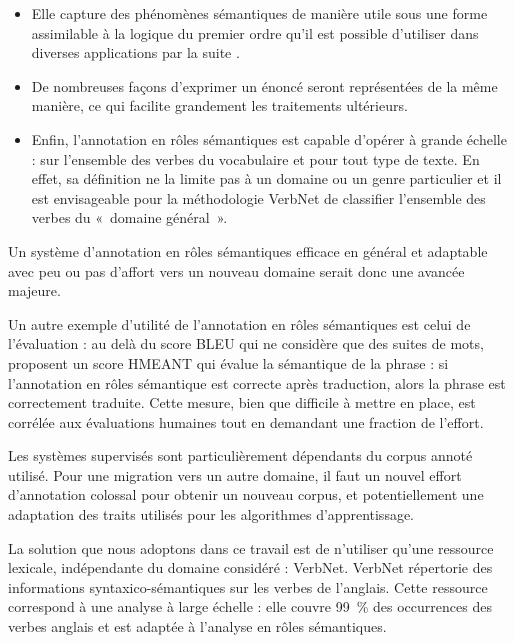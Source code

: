 \documentclass[oneside,parskip]{scrbook}
\begin{document}
\begin{itemize}

    \item Elle capture des phénomènes sémantiques de manière utile sous une
    forme assimilable à la logique du premier ordre qu'il est possible
    d'utiliser dans diverses applications par la suite
    \citep{osman2012improved,xie2013semantic}.

    \item De nombreuses façons d'exprimer un énoncé seront représentées de la
    même manière, ce qui facilite grandement les traitements ultérieurs.

    \item Enfin, l'annotation en rôles sémantiques est capable d'opérer à
    grande échelle : sur l'ensemble des verbes du vocabulaire et pour tout
    type de texte.  En effet, sa définition ne la limite pas à un domaine
    ou un genre particulier et il est envisageable pour la méthodologie
    VerbNet de classifier l'ensemble des verbes du «~domaine général~».

\end{itemize}


Un système d'annotation en rôles sémantiques efficace en général et adaptable
avec peu ou pas d'affort vers un nouveau domaine serait donc une avancée
majeure.

Un autre exemple d'utilité de l'annotation en rôles sémantiques est celui de
l'évaluation : au delà du score BLEU qui ne considère que des suites de mots,
\cite{lo2011smt} proposent un score HMEANT qui évalue la sémantique de la
phrase : si l'annotation en rôles sémantique est correcte après traduction,
alors la phrase est correctement traduite. Cette mesure, bien que difficile à
mettre en place, est corrélée aux évaluations humaines tout en demandant une
fraction de l'effort.

Les systèmes supervisés sont particulièrement dépendants du corpus annoté
utilisé. Pour une migration vers un autre domaine, il faut un nouvel effort
d'annotation colossal pour obtenir un nouveau corpus, et potentiellement une
adaptation des traits utilisés pour les algorithmes d'apprentissage.

La solution que nous adoptons dans ce travail est de n'utiliser qu'une
ressource lexicale, indépendante du domaine considéré : VerbNet. VerbNet
répertorie des informations syntaxico-sémantiques sur les verbes de l'anglais.
Cette ressource correspond à une analyse à large échelle : elle couvre 99~\%
des occurrences des verbes anglais \citep[partie 1, p~.53]{palmer2013semantic}
et est adaptée à l'analyse en rôles sémantiques.
\end{document}

